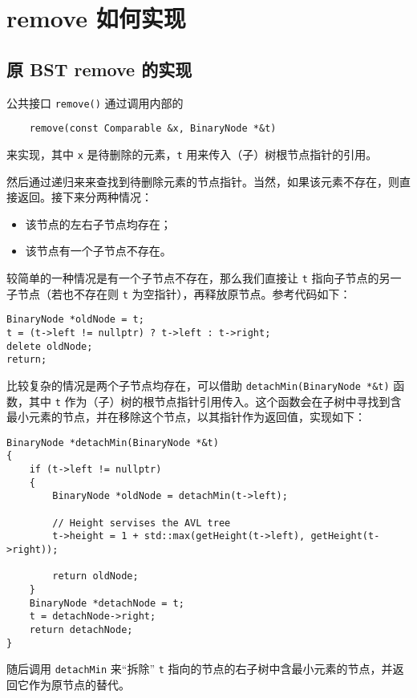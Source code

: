 \documentclass[UTF8, a4paper, 12pt]{ctexart}
\begin{document}
\section{remove 如何实现}

\subsection{原 BST remove 的实现}
公共接口 \verb|remove()| 通过调用内部的

\begin{verbatim}
    remove(const Comparable &x, BinaryNode *&t)
\end{verbatim}

来实现，其中 \verb|x| 是待删除的元素，\verb|t| 用来传入（子）树根节点指针的引用。

然后通过递归来来查找到待删除元素的节点指针。当然，如果该元素不存在，则直接返回。接下来分两种情况：

\begin{itemize}
    \item 该节点的左右子节点均存在；
    \item 该节点有一个子节点不存在。
\end{itemize}

较简单的一种情况是有一个子节点不存在，那么我们直接让 \verb|t| 指向子节点的另一子节点（若也不存在则 \verb|t| 为空指针），再释放原节点。参考代码如下：

\begin{lstlisting}
BinaryNode *oldNode = t;
t = (t->left != nullptr) ? t->left : t->right;
delete oldNode;
return;
\end{lstlisting}

比较复杂的情况是两个子节点均存在，可以借助 \verb|detachMin(BinaryNode *&t)| 函数，其中 \verb|t| 作为（子）树的根节点指针引用传入。这个函数会在子树中寻找到含最小元素的节点，并在移除这个节点，以其指针作为返回值，实现如下：

\begin{lstlisting}
BinaryNode *detachMin(BinaryNode *&t)
{
    if (t->left != nullptr)
    {
        BinaryNode *oldNode = detachMin(t->left);

        // Height servises the AVL tree
        t->height = 1 + std::max(getHeight(t->left), getHeight(t->right)); 

        return oldNode;
    }
    BinaryNode *detachNode = t;
    t = detachNode->right;
    return detachNode;
}
\end{lstlisting}

随后调用 \verb|detachMin| 来“拆除” \verb|t| 指向的节点的右子树中含最小元素的节点，并返回它作为原节点的替代。
\end{document}
